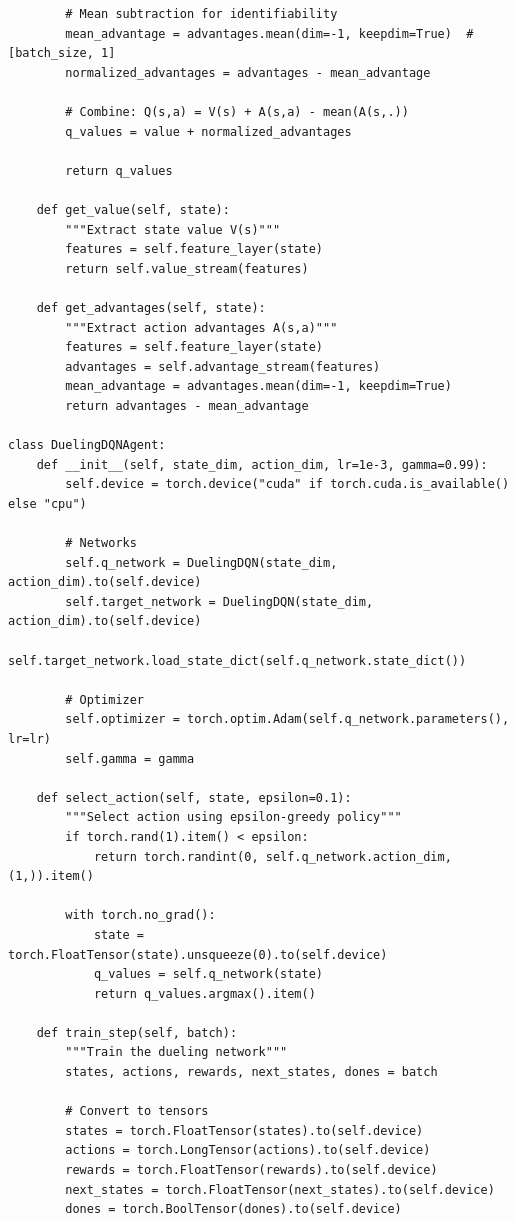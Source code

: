 \documentclass[12pt]{article}
\begin{document}
{{\begin{verbatim}
        # Mean subtraction for identifiability
        mean_advantage = advantages.mean(dim=-1, keepdim=True)  # [batch_size, 1]
        normalized_advantages = advantages - mean_advantage
        
        # Combine: Q(s,a) = V(s) + A(s,a) - mean(A(s,.))
        q_values = value + normalized_advantages
        
        return q_values
    
    def get_value(self, state):
        """Extract state value V(s)"""
        features = self.feature_layer(state)
        return self.value_stream(features)
    
    def get_advantages(self, state):
        """Extract action advantages A(s,a)"""
        features = self.feature_layer(state)
        advantages = self.advantage_stream(features)
        mean_advantage = advantages.mean(dim=-1, keepdim=True)
        return advantages - mean_advantage

class DuelingDQNAgent:
    def __init__(self, state_dim, action_dim, lr=1e-3, gamma=0.99):
        self.device = torch.device("cuda" if torch.cuda.is_available() else "cpu")
        
        # Networks
        self.q_network = DuelingDQN(state_dim, action_dim).to(self.device)
        self.target_network = DuelingDQN(state_dim, action_dim).to(self.device)
        self.target_network.load_state_dict(self.q_network.state_dict())
        
        # Optimizer
        self.optimizer = torch.optim.Adam(self.q_network.parameters(), lr=lr)
        self.gamma = gamma
        
    def select_action(self, state, epsilon=0.1):
        """Select action using epsilon-greedy policy"""
        if torch.rand(1).item() < epsilon:
            return torch.randint(0, self.q_network.action_dim, (1,)).item()
        
        with torch.no_grad():
            state = torch.FloatTensor(state).unsqueeze(0).to(self.device)
            q_values = self.q_network(state)
            return q_values.argmax().item()
    
    def train_step(self, batch):
        """Train the dueling network"""
        states, actions, rewards, next_states, dones = batch
        
        # Convert to tensors
        states = torch.FloatTensor(states).to(self.device)
        actions = torch.LongTensor(actions).to(self.device)
        rewards = torch.FloatTensor(rewards).to(self.device)
        next_states = torch.FloatTensor(next_states).to(self.device)
        dones = torch.BoolTensor(dones).to(self.device)
        

\end{verbatim}}}
\end{document}
